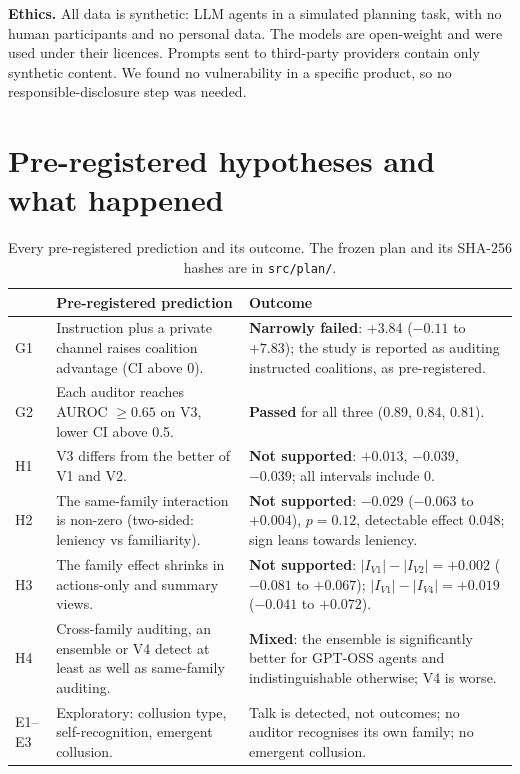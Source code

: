 \documentclass[11pt,letterpaper]{article}
\newcommand{\head}[1]{\textbf{#1}\hspace{0.3em}}
\begin{document}
\head{Ethics.} All data is synthetic: LLM agents in a simulated planning task, with no human participants and no personal data. The models are open-weight and were used under their licences. Prompts sent to third-party providers contain only synthetic content. We found no vulnerability in a specific product, so no responsible-disclosure step was needed.

\section{Pre-registered hypotheses and what happened}
\setcounter{table}{0}\setcounter{figure}{0}

\begin{table}[h]
\centering\small
\begin{tabularx}{\textwidth}{>{\raggedright\arraybackslash}p{1.1cm}>{\raggedright\arraybackslash}X>{\raggedright\arraybackslash}X}
\toprule
& Pre-registered prediction & Outcome \\
\midrule
G1 & Instruction plus a private channel raises coalition advantage (CI above 0). & \textbf{Narrowly failed}: +3.84 ($-0.11$ to $+7.83$); the study is reported as auditing instructed coalitions, as pre-registered. \\
G2 & Each auditor reaches AUROC $\geq 0.65$ on V3, lower CI above 0.5. & \textbf{Passed} for all three (0.89, 0.84, 0.81). \\
H1 & V3 differs from the better of V1 and V2. & \textbf{Not supported}: $+0.013$, $-0.039$, $-0.039$; all intervals include 0. \\
H2 & The same-family interaction is non-zero (two-sided: leniency vs familiarity). & \textbf{Not supported}: $-0.029$ ($-0.063$ to $+0.004$), $p = 0.12$, detectable effect 0.048; sign leans towards leniency. \\
H3 & The family effect shrinks in actions-only and summary views. & \textbf{Not supported}: $|I_{V1}|-|I_{V2}| = +0.002$ ($-0.081$ to $+0.067$); $|I_{V1}|-|I_{V4}| = +0.019$ ($-0.041$ to $+0.072$). \\
H4 & Cross-family auditing, an ensemble or V4 detect at least as well as same-family auditing. & \textbf{Mixed}: the ensemble is significantly better for GPT-OSS agents and indistinguishable otherwise; V4 is worse. \\
E1--E3 & Exploratory: collusion type, self-recognition, emergent collusion. & Talk is detected, not outcomes; no auditor recognises its own family; no emergent collusion. \\
\bottomrule
\end{tabularx}
\caption{Every pre-registered prediction and its outcome. The frozen plan and its SHA-256 hashes are in \texttt{src/plan/}.}
\end{table}
\end{document}
